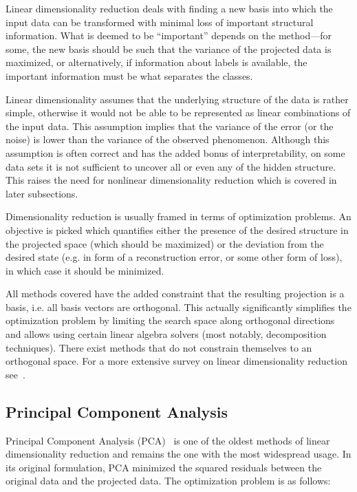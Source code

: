 Linear dimensionality reduction deals with finding a new basis into which
the input data can be transformed with minimal loss of important structural
information.  What is deemed to be ``important'' depends on the method---for
some, the new basis should be such that the variance of the projected data is
maximized, or alternatively, if information about labels is available, the
important information must be what separates the classes.

Linear dimensionality assumes that the underlying structure of the data is
rather simple, otherwise it would not be able to be represented as linear
combinations of the input data. This assumption implies that the variance of
the error (or the noise) is lower than the variance of the observed phenomenon.
Although this assumption is often correct and has the added bonus of
interpretability, on some data sets it is not sufficient to uncover all or even
any of the hidden structure. This raises the need for nonlinear dimensionality
reduction which is covered in later subsections.

Dimensionality reduction is usually framed in terms of optimization problems. An
objective is picked which quantifies either the presence of the desired structure
in the projected space (which should be maximized) or the deviation from the desired
state (e.g. in form of a reconstruction error, or some other form of loss), in which case
it should be minimized.

All methods covered have the added constraint that the resulting projection is
a basis, i.e. all basis vectors are orthogonal. This actually significantly
simplifies the optimization problem by limiting the search space along
orthogonal directions and allows using certain linear algebra solvers (most
notably, decomposition techniques). There exist methods that do not constrain
themselves to an orthogonal space. For a more extensive survey on linear
dimensionality reduction see~\cite{linearsurvey}.

\subsection{Principal Component Analysis}

Principal Component Analysis (PCA)~\cite{pearson_pca} is one of the oldest methods of linear dimensionality
reduction and remains the one with the most widespread usage. In its original formulation,
PCA minimized the squared residuals between the original data and the projected data. The
optimization problem is as follows:

